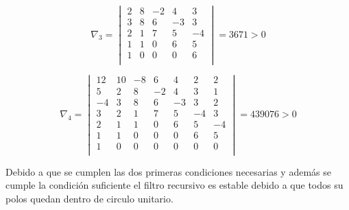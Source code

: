 \begin{equation}
    \nabla_3 = \begin{vmatrix}
                2 & 8 & -2 & 4 & 3\\
                3 & 8 & 6 & -3 & 3\\
                2 & 1 & 7 & 5 & -4 \\
                1 & 1 & 0 & 6 & 5\\
                1 & 0 & 0 & 0 & 6\\
                
                \end{vmatrix} = 3671 > 0
\end{equation}

\begin{equation}
    \nabla_4 = \begin{vmatrix}
                12 & 10 & -8 & 6 & 4 & 2  & 2 \\
                5 & 2 & 8 & -2 & 4 & 3  & 1 \\
                -4 & 3 & 8 & 6  & -3& 3  & 2 \\
                3 & 2 & 1 & 7  & 5 & -4 & 3 \\
                2 & 1 & 1 & 0  & 6 & 5  & -4\\
                1 & 1 & 0 & 0  & 0 & 6  & 5 \\
                1 & 0 & 0 & 0  & 0 & 0 & 0  \\
                \end{vmatrix} = 439076 > 0
\end{equation}

Debido a que se cumplen las dos primeras condiciones necesarias y adem\'as se cumple la condici\'on suficiente el filtro recursivo es estable debido a que todos su polos quedan dentro de circulo unitario. 
